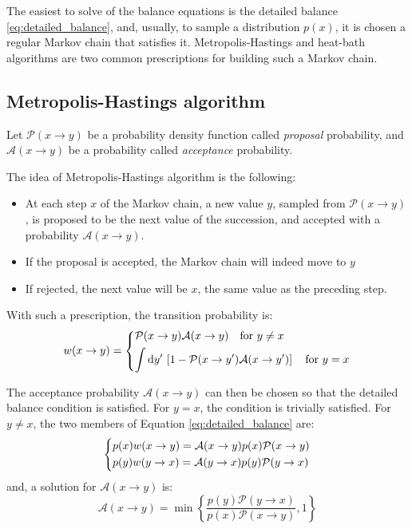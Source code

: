 The easiest to solve of the balance equations is the detailed balance \eqref{eq:detailed_balance},
and, usually, to sample a distribution $p(x)$, it is chosen a regular Markov chain that satisfies it.
Metropolis-Hastings and heat-bath algorithms are two common prescriptions for building such a Markov chain.

\subsection*{Metropolis-Hastings algorithm}
Let $\mathcal P(x\to y)$ be a probability density function called \emph{proposal} probability,
and $\mathcal A(x\to y)$ be a probability called \emph{acceptance} probability.

The idea of Metropolis-Hastings algorithm is the following:
\begin{itemize}
    \item At each step $x$ of the Markov chain, a new value $y$, sampled from $\mathcal P(x\to y)$,
        is proposed to be the next value of the succession, and accepted with a probability $\mathcal A(x\to y)$.
    \item If the proposal is accepted, the Markov chain will indeed move to $y$
    \item If rejected, the next value will be $x$, \ie the same value as the preceding step.
\end{itemize}

With such a prescription, the transition probability is:
\begin{equation}\label{eq:metropolis_transition}
    w(x\to y) = 
    \begin{dcases}
        \mathcal P(x\to y)\mathcal A(x\to y) \quad \mathrm{for}\ y \neq x \\
        \int\mathrm dy'\,\left[1 - \mathcal P(x\to y')\mathcal A(x\to y')\right] \quad \mathrm{for}\ y=x
    \end{dcases}
\end{equation}

The acceptance probability $\mathcal A(x\to y)$ can then be chosen so that the detailed balance condition is satisfied.
For $y=x$, the condition is trivially satisfied. 
For $y\neq x$, the two members of Equation \eqref{eq:detailed_balance} are:
\[
    \begin{dcases}
        p(x)w(x\to y) = \mathcal A(x\to y)p(x)\mathcal P(x\to y) \\
        p(y)w(y\to x) = \mathcal A(y\to x)p(y)\mathcal P(y\to x)
    \end{dcases}
\]
and, a solution for $\mathcal A(x\to y)$ is:
\begin{equation}\label{eq:acceptance}
    \mathcal A(x\to y) = \min\left\{\frac{p(y)\mathcal P(y\to x)}{p(x)\mathcal P(x\to y)},1\right\}
\end{equation}

